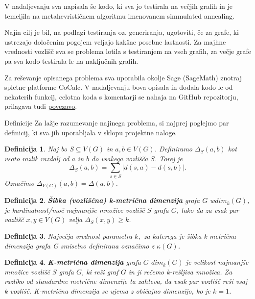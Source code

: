 \documentclass[12pt,a4paper]{amsart}
\makeatletter
\renewcommand\section{\@startsection{section}{1}%
  \z@{.5\linespacing\@plus.7\linespacing}{.5\linespacing}%
  {\normalfont\scshape\large\centering}}
\theoremstyle{plain} %
\newtheorem{definition}{Definicija}[section]
\makeatother
\begin{document}
V nadaljevanju sva napisala še kodo, ki sva jo testirala na večjih grafih in je temeljila na metahevrističnem algoritmu imenovanem simmulated annealing.

\bigskip
Najin cilj je bil, na podlagi testiranja oz. generiranja, ugotoviti, če za grafe, ki ustrezajo določenim 
pogojem veljajo kakšne posebne lastnosti. 
Za majhne vrednosti vozlišč sva se problema lotila s testiranjem na vseh grafih, 
za večje grafe pa sva kodo testirala le na naključnih grafih.

\bigskip
Za reševanje opisanega problema sva uporabila okolje Sage (SageMath) znotraj spletne platforme CoCalc. 
V nadaljevanju bova opisala in dodala kodo le od nekaterih funkcij, celotna koda s komentarji
se nahaja na GitHub repozitorju, prilagava tudi \href{https://github.com/mihajan/Weak-k-Metric-Dimension}{povezavo}.


\bigskip
\section{Definicije}
Za lažje razumevanje najinega problema, si najprej poglejmo par definicij, ki sva jih uporabljala v sklopu projektne naloge.
\begin{definition}
    Naj bo $S \subseteq V(G)$ in $a, b \in V(G)$. Definiramo $\Delta_S (a,b)$ kot vsoto razlik razdalj od $a$ in $b$ do vsakega vozlišča $S$. 
    Torej je $$\Delta_S (a,b) = \sum_{s \in S } |d(s,a) - d(s,b)|.$$
    Označimo $\Delta_{V(G)} (a,b) = \Delta (a,b)$.
\end{definition}

\begin{definition} 
    {\bf Šibka (vozliščna) k-metrična dimenzija} grafa $G$ $wdim_k(G)$, je kardinalnost/moč
    najmanjše množice vozlišč $S$ grafa $G$, tako da za vsak par vozlišč $x,y \in V(G)$ velja $\Delta_S (x,y) \geq k$.
\end{definition}

\begin{definition}
    Največja vrednost parametra $k,$ za katerega je šibka k-metrična dimenzija grafa G smiselno definirana označimo z $\kappa(G)$. 
\end{definition}

\begin{definition}
    {\bf K-metrična dimenzija} grafa $G$ $dim_k(G)$ je velikost najmanjše množice vozlišč $S$ grafa $G$, ki reši graf $G$ in ji rečemo k-rešljiva množica. 
    Za razliko od standardne metrične dimenzije ta zahteva, da vsak par vozlišč reši vsaj k vozlišč. K-metrična dimenzija se ujema z običajno dimenzijo, ko je $k = 1$.
\end{definition}
\bigskip
\end{document}

